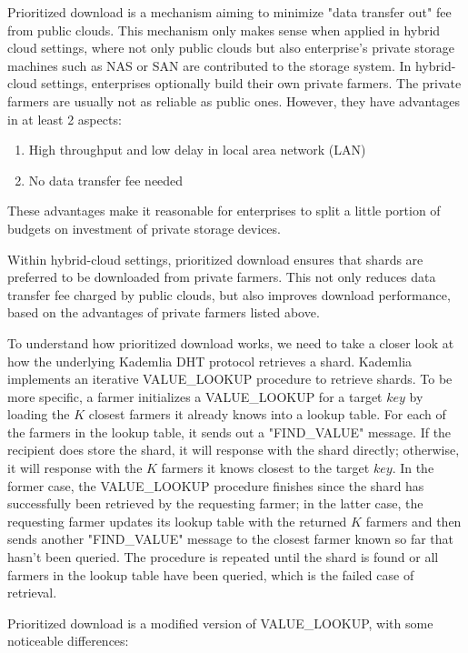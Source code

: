 Prioritized download is a mechanism aiming to minimize "data transfer out" fee from public clouds. This mechanism only makes sense when applied in hybrid cloud settings, where not only public clouds but also enterprise's private storage machines such as NAS or SAN are contributed to the storage system. In hybrid-cloud settings, enterprises optionally build their own private farmers. The private farmers are usually not as reliable as public ones. However, they have advantages in at least 2 aspects:

\begin{enumerate}
  \item High throughput and low delay in local area network (LAN)
  \item No data transfer fee needed
\end{enumerate}

These advantages make it reasonable for enterprises to split a little portion of budgets on investment of private storage devices.

Within hybrid-cloud settings, prioritized download ensures that shards are preferred to be downloaded from private farmers. This not only reduces data transfer fee charged by public clouds, but also improves download performance, based on the advantages of private farmers listed above.

To understand how prioritized download works, we need to take a closer look at how the underlying Kademlia DHT protocol retrieves a shard. Kademlia implements an iterative VALUE\_LOOKUP procedure to retrieve shards. To be more specific, a farmer initializes a VALUE\_LOOKUP for a target $key$ by loading the $K$ closest farmers it already knows into a lookup table. For each of the farmers in the lookup table, it sends out a "FIND\_VALUE" message. If the recipient does store the shard, it will response with the shard directly; otherwise, it will response with the $K$ farmers it knows closest to the target $key$. In the former case, the VALUE\_LOOKUP procedure finishes since the shard has successfully been retrieved by the requesting farmer; in the latter case, the requesting farmer updates its lookup table with the returned $K$ farmers and then sends another "FIND\_VALUE" message to the closest farmer known so far that hasn't been queried. The procedure is repeated until the shard is found or all farmers in the lookup table have been queried, which is the failed case of retrieval.

Prioritized download is a modified version of VALUE\_LOOKUP, with some noticeable differences:

